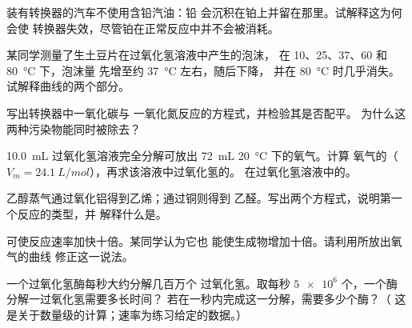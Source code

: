 \begin{exercise}[$\star\star$]\label{exo:g12:catalysis:8}
装有转换器的汽车不使用含铅汽油：铅
会沉积在铂上并留在那里。试解释这为何会使
转换器失效，尽管铂在正常反应中并不会被消耗。
\end{exercise}

\begin{exercise}[$\star\star$]\label{exo:g12:catalysis:9}
某同学测量了生土豆片在过氧化氢溶液中产生的泡沫，
在 10、25、37、60 和 \qty{80}{\celsius} 下，泡沫量
先增至约 \qty{37}{\celsius} 左右，随后下降，
并在 \qty{80}{\celsius} 时几乎消失。试解释曲线的两个部分。
\end{exercise}

\begin{exercise}[$\star\star$]\label{exo:g12:catalysis:10}
写出转换器中一氧化碳与
一氧化氮反应的方程式，并检验其是否配平。
为什么这两种污染物能同时被除去？
\end{exercise}

\begin{exercise}[$\star\star$]\label{exo:g12:catalysis:11}
\qty{10.0}{mL} 过氧化氢溶液完全分解可放出 \qty{72}{mL}
\qty{20}{\celsius} 下的氧气。计算
氧气的（$V_m = \qty{24.1}{L/mol}$），再求该溶液中过氧化氢的。
在过氧化氢溶液中的。
\end{exercise}

\begin{exercise}[$\star\star\star$]\label{exo:g12:catalysis:12}
乙醇蒸气通过氧化铝得到乙烯；通过铜则得到
乙醛。写出两个方程式，说明第一个反应的类型，并
解释什么是。
\end{exercise}

\begin{exercise}[$\star\star\star$]\label{exo:g12:catalysis:13}
可使反应速率加快十倍。某同学认为它也
能使生成物增加十倍。请利用所放出氧气的曲线
修正这一说法。
\end{exercise}

\begin{exercise}[$\star\star\star$]\label{exo:g12:catalysis:14}
一个过氧化氢酶每秒大约分解几百万个
过氧化氢。取每秒 $\num{5e6}$ 个，一个酶
分解一过氧化氢需要多长时间？
若在一秒内完成这一分解，需要多少个酶？（
这是关于数量级的计算；速率为练习给定的数据。）
\end{exercise}

